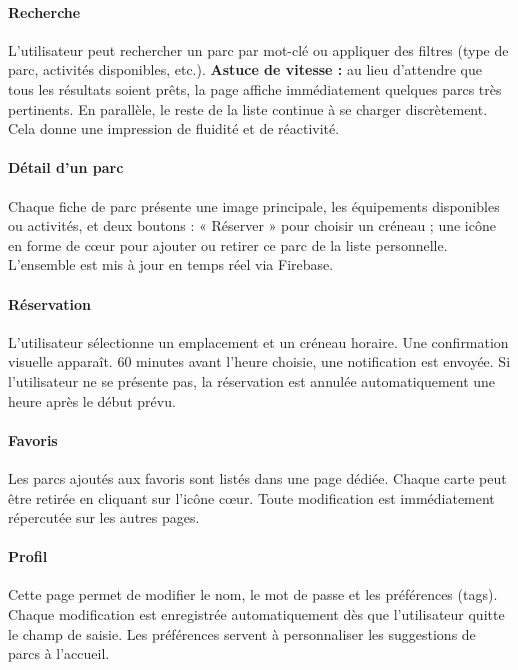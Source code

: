 \documentclass[12pt,a4paper]{article}
\begin{document}
\paragraph{Recherche \\}
L'utilisateur peut rechercher un parc par mot-clé ou appliquer des filtres (type de parc, activités disponibles, etc.).  
\textbf{Astuce de vitesse :} au lieu d'attendre que tous les résultats soient prêts, la page affiche immédiatement quelques parcs très pertinents. En parallèle, le reste de la liste continue à se charger discrètement. Cela donne une impression de fluidité et de réactivité.

\paragraph{Détail d'un parc \\}
Chaque fiche de parc présente une image principale, les équipements disponibles ou activités, et deux boutons :  
 « Réserver » pour choisir un créneau ;  
 une icône en forme de cœur pour ajouter ou retirer ce parc de la liste personnelle.  
L'ensemble est mis à jour en temps réel via Firebase.

\paragraph{Réservation \\}
L'utilisateur sélectionne un emplacement et un créneau horaire. Une confirmation visuelle apparaît.  
60 minutes avant l'heure choisie, une notification est envoyée. Si l'utilisateur ne se présente pas, la réservation est annulée automatiquement une heure après le début prévu.

\paragraph{Favoris \\}
Les parcs ajoutés aux favoris sont listés dans une page dédiée. Chaque carte peut être retirée en cliquant sur l'icône cœur. Toute modification est immédiatement répercutée sur les autres pages.

\paragraph{Profil \\}
Cette page permet de modifier le nom, le mot de passe et les préférences (tags). Chaque modification est enregistrée automatiquement dès que l'utilisateur quitte le champ de saisie. Les préférences servent à personnaliser les suggestions de parcs à l'accueil.
\end{document}
